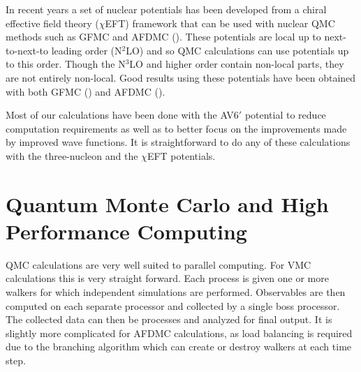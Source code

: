 In recent years a set of nuclear potentials has been developed from a chiral effective field theory ($\chi$EFT) framework that can be used with nuclear QMC methods such as GFMC and AFDMC (\cite{epelbaum2009,machleidt2011}). These potentials are local up to next-to-next-to leading order (N$^2$LO) and so QMC calculations can use potentials up to this order. Though the N$^3$LO and higher order contain non-local parts, they are not entirely non-local. Good results using these potentials have been obtained with both GFMC (\cite{lynn2014}) and AFDMC (\cite{lonardoni2018}).

Most of our calculations have been done with the AV6$'$ potential to reduce computation requirements as well as to better focus on the improvements made by improved wave functions. It is straightforward to do any of these calculations with the three-nucleon and the $\chi$EFT potentials.

\section{Quantum Monte Carlo and High Performance Computing}
QMC calculations are very well suited to parallel computing. For VMC calculations this is very straight forward. Each process is given one or more walkers for which independent simulations are performed. Observables are then computed on each separate processor and collected by a single boss processor. The collected data can then be processes and analyzed for final output. It is slightly more complicated for AFDMC calculations, as load balancing is required due to the branching algorithm which can create or destroy walkers at each time step.

